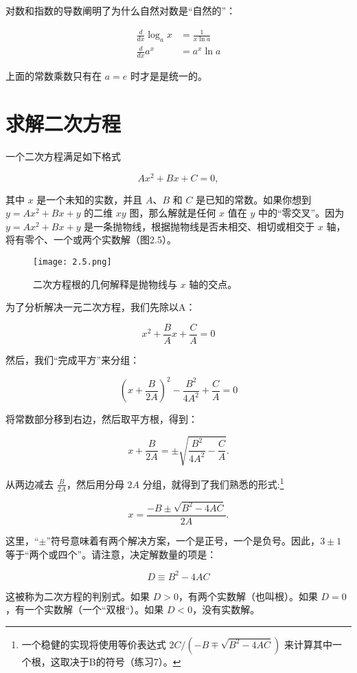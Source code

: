 \documentclass[lang=cn,12pt]{elegantbook}
\begin{document}
对数和指数的导数阐明了为什么自然对数是“自然的”：


$$
\begin{aligned}
\frac{d}{d x} \log _{a} x &=\frac{1}{x \ln a} \\
\frac{d}{d x} a^{x} &=a^{x} \ln a
\end{aligned}
$$

上面的常数乘数只有在 $a = e$ 时才是是统一的。

\section{求解二次方程}

一个二次方程满足如下格式

$$Ax^2+Bx+C=0,$$

其中 $x$ 是一个未知的实数，并且 $A$、$B$ 和 $C$ 是已知的常数。如果你想到 $y=Ax^2+Bx+y$ 的二维 $xy$ 图，那么解就是任何 $x$ 值在 $y$ 中的“零交叉”。因为 $y=Ax^2+Bx+y$ 是一条抛物线，根据抛物线是否未相交、相切或相交于 $x$ 轴，将有零个、一个或两个实数解（图2.5）。

\begin{figure}[htbp]
\centering
\texttt{[image: 2.5.png]}
\caption{二次方程根的几何解释是抛物线与 $x$ 轴的交点。}
\end{figure}

为了分析解决一元二次方程，我们先除以A：

$$x^2+\frac{B}{A} x+\frac{C}{A}=0$$

然后，我们“完成平方”来分组：

$$\left(x+\frac{B}{2 A}\right)^{2}-\frac{B^{2}}{4 A^{2}}+\frac{C}{A}=0$$

将常数部分移到右边，然后取平方根，得到：

$$
x+\frac{B}{2 A}=\pm \sqrt{\frac{B^{2}}{4 A^{2}}-\frac{C}{A}} .
$$

从两边减去 $\frac{B}{2 A}$，然后用分母 $2A$ 分组，就得到了我们熟悉的形式:\footnote{一个稳健的实现将使用等价表达式 $2 C /\left(-B \mp \sqrt{B^{2}-4 A C}\right)$ 来计算其中一个根，这取决于B的符号（练习7）。}


\begin{equation} x=\frac{-B \pm \sqrt{B^{2}-4 A C}}{2 A} . \end{equation}

这里，“$\pm$”符号意味着有两个解决方案，一个是正号，一个是负号。因此，$3\pm1$ 等于“两个或四个”。请注意，决定解数量的项是：

$$
D \equiv B^{2}-4 A C
$$

这被称为二次方程的判别式。如果 $D>0$，有两个实数解（也叫根）。如果 $D=0$，有一个实数解（一个``双根“）。如果 $D<0$，没有实数解。
\end{document}

